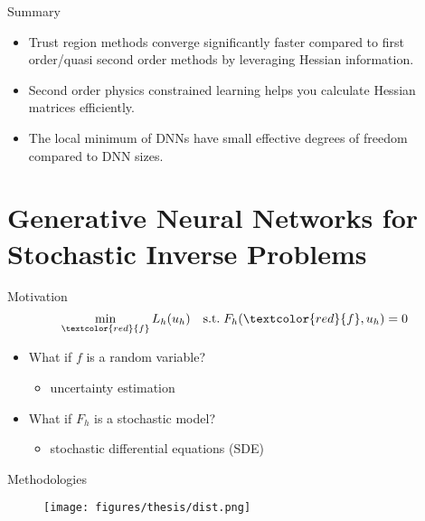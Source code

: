 \documentclass[usenames,dvipsnames]{beamer}
\begin{document}
\begin{frame}{Summary}
	\begin{itemize}
\item Trust region methods converge significantly faster compared to first order/quasi second order methods by leveraging Hessian information. 

\item Second order physics constrained learning helps you calculate Hessian matrices efficiently. 

\item The local minimum of DNNs have small effective degrees of freedom compared to DNN sizes. 
	\end{itemize}
\end{frame}

\section{Generative Neural Networks for Stochastic Inverse Problems}

\begin{frame}{Motivation}
		\begin{equation*}
		\min_{\textcolor{red}{f}} L_h(u_h) \quad \mathrm{s.t.}\; F_h(\textcolor{red}{f}, u_h) = 0
	\end{equation*}
	\begin{itemize}
\item What if $f$ is a random variable?
\begin{itemize}
	\item uncertainty estimation
\end{itemize}
\item What if $F_h$ is a stochastic model?
\begin{itemize}
	\item stochastic differential equations (SDE)
\end{itemize}
	\end{itemize}
\end{frame}

\begin{frame}{Methodologies}
		\begin{figure}[htbp]
		\centering
		\texttt{[image: figures/thesis/dist.png]}
	\end{figure}
\end{frame}
\end{document}
